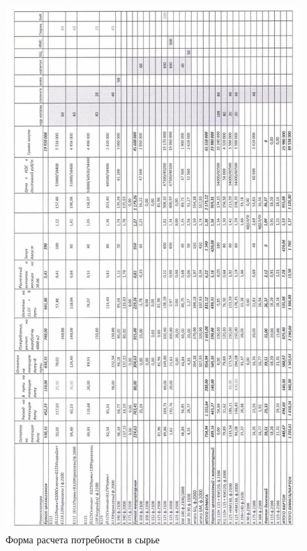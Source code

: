 \begin{figure}
\begin{center}
  \includegraphics[height=0.8\textheight, keepaspectratio]{Pics/d37.jpg}
\end{center}
  \caption{Форма расчета потребности в сырье}
  \label{pic:d37}
\end{figure}
\clearpage

